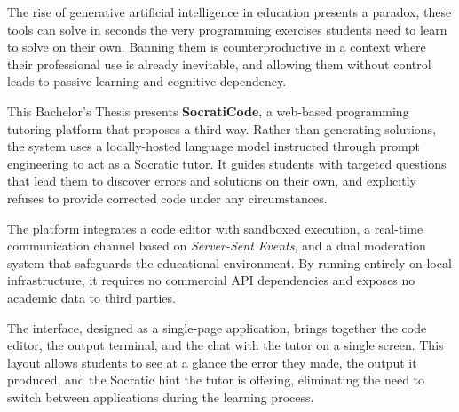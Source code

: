 The rise of generative artificial intelligence in education presents a paradox, these tools can solve in seconds the very programming exercises students need to learn to solve on their own. Banning them is counterproductive in a context where their professional use is already inevitable, and allowing them without control leads to passive learning and cognitive dependency.

This Bachelor's Thesis presents \textbf{SocratiCode}, a web-based programming tutoring platform that proposes a third way. Rather than generating solutions, the system uses a locally-hosted language model instructed through prompt engineering to act as a Socratic tutor. It guides students with targeted questions that lead them to discover errors and solutions on their own, and explicitly refuses to provide corrected code under any circumstances.

The platform integrates a code editor with sandboxed execution, a real-time communication channel based on \textit{Server-Sent Events}, and a dual moderation system that safeguards the educational environment. By running entirely on local infrastructure, it requires no commercial API dependencies and exposes no academic data to third parties.

The interface, designed as a single-page application, brings together the code editor, the output terminal, and the chat with the tutor on a single screen. This layout allows students to see at a glance the error they made, the output it produced, and the Socratic hint the tutor is offering, eliminating the need to switch between applications during the learning process.

